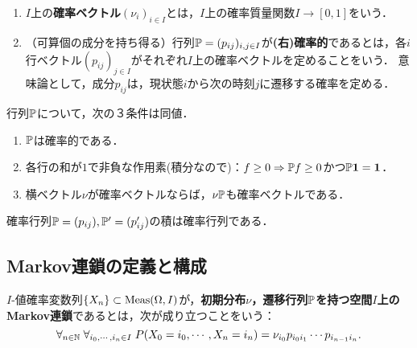 \documentclass[uplatex,dvipdfmx]{jsreport}
\begin{document}
\begin{definition}\mbox{}
    \begin{enumerate}
        \item $I$上の\textbf{確率ベクトル}$(\nu_i)_{i\in I}$とは，$I$上の確率質量関数$I\to[0,1]$をいう．
        \item （可算個の成分を持ち得る）行列$\mathbb{P}=(p_{ij})_{i,j\in I}$が\textbf{(右)確率的}であるとは，各$i$行ベクトル$(p_{ij})_{j\in I}$がそれぞれ$I$上の確率ベクトルを定めることをいう．
        意味論として，成分$p_{ij}$は，現状態$i$から次の時刻$j$に遷移する確率を定める．
    \end{enumerate}
\end{definition}

\begin{lemma}[確率行列の特徴付け]
    行列$\mathbb{P}$について，次の３条件は同値．
    \begin{enumerate}
        \item $\mathbb{P}$は確率的である．
        \item 各行の和が$1$で非負な作用素(積分なので)：$f\ge0\Rightarrow\mathbb{P} f\ge0$かつ$\mathbb{P}\mathbf{1}=\mathbf{1}$．
        \item 横ベクトル$\nu$が確率ベクトルならば，$\nu\mathbb{P}$も確率ベクトルである．
    \end{enumerate}
\end{lemma}

\begin{lemma}[確率行列は群をなす？]
    確率行列$\mathbb{P}=(p_{ij}),\mathbb{P}'=(p'_{ij})$の積は確率行列である．
\end{lemma}

\subsection{Markov連鎖の定義と構成}

\begin{definition}
    $I$-値確率変数列$\{X_n\}\subset\mathrm{Meas}(\Omega,I)$が，\textbf{初期分布$\nu$，遷移行列$\mathbb{P}$を持つ空間$I$上のMarkov連鎖}であるとは，次が成り立つことをいう：
    \[\forall_{n\in\mathbb{N}}\;\forall_{i_0,\cdots,i_n\in I}\;P(X_0=i_0,\cdots,X_n=i_n)=\nu_{i_0}p_{i_0i_1}\cdots p_{i_{n-1}i_n}.\]
\end{definition}
\end{document}
